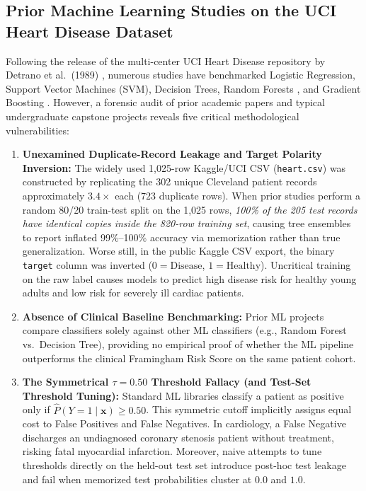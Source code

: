 \documentclass[12pt,a4paper]{report}
\begin{document}
\subsection{Prior Machine Learning Studies on the UCI Heart Disease Dataset}
Following the release of the multi-center UCI Heart Disease repository by Detrano et al.\ (1989) \cite{detrano1989international}, numerous studies have benchmarked Logistic Regression, Support Vector Machines (SVM), Decision Trees, Random Forests \cite{breiman2001random}, and Gradient Boosting \cite{friedman2001greedy,chen2016xgboost}. However, a forensic audit of prior academic papers and typical undergraduate capstone projects reveals five critical methodological vulnerabilities:

\begin{enumerate}
    \item \textbf{Unexamined Duplicate-Record Leakage and Target Polarity Inversion:} The widely used 1,025-row Kaggle/UCI CSV (\texttt{heart.csv}) was constructed by replicating the 302 unique Cleveland patient records approximately $3.4\times$ each ($723$ duplicate rows). When prior studies perform a random 80/20 train-test split on the 1,025 rows, \emph{100\% of the 205 test records have identical copies inside the 820-row training set}, causing tree ensembles to report inflated 99\%--100\% accuracy via memorization rather than true generalization. Worse still, in the public Kaggle CSV export, the binary \texttt{target} column was inverted ($0 = \text{Disease}$, $1 = \text{Healthy}$). Uncritical training on the raw label causes models to predict high disease risk for healthy young adults and low risk for severely ill cardiac patients.
    \item \textbf{Absence of Clinical Baseline Benchmarking:} Prior ML projects compare classifiers solely against other ML classifiers (e.g., Random Forest vs.\ Decision Tree), providing no empirical proof of whether the ML pipeline outperforms the clinical Framingham Risk Score on the same patient cohort.
    \item \textbf{The Symmetrical $\tau = 0.50$ Threshold Fallacy (and Test-Set Threshold Tuning):} Standard ML libraries classify a patient as positive only if $\hat{P}(Y=1 \mid \bm{x}) \ge 0.50$. This symmetric cutoff implicitly assigns equal cost to False Positives and False Negatives. In cardiology, a False Negative discharges an undiagnosed coronary stenosis patient without treatment, risking fatal myocardial infarction. Moreover, naive attempts to tune thresholds directly on the held-out test set introduce post-hoc test leakage and fail when memorized test probabilities cluster at $0.0$ and $1.0$.

\end{enumerate}
\end{document}
